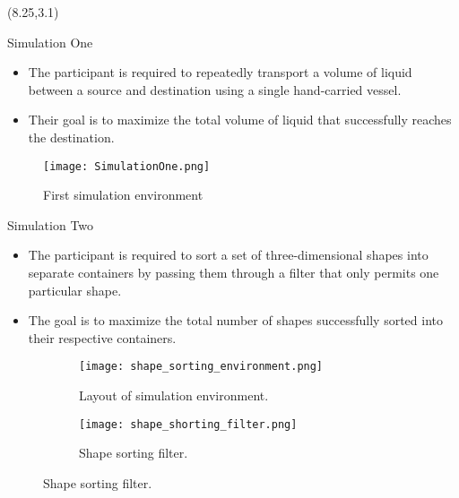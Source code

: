 \documentclass[22pt]{beamer}
\begin{document}
\begin{frame}[fragile]
\begin{textblock}{7.25}
\end{textblock}




\begin{textblock}{7.25}(8.25,3.1)

\begin{block}{Simulation One}\newline
\begin{itemize}
\item The participant is required to repeatedly transport a
volume of liquid between a source and destination using a single hand-carried
vessel.
\item Their goal is to maximize the total volume of liquid that successfully
reaches the destination.
\end{itemize}

\begin{figure}
  \centering
  \texttt{[image: SimulationOne.png]}
  \caption{First simulation environment}
\label{fig:simOne}
\end{figure}

\end{block}



\begin{block}{Simulation Two}\newline
\begin{itemize}
\item The participant is required to sort a set of three-dimensional shapes into separate containers by passing them through a filter that only permits one particular shape.
\item The goal is to maximize the total number of shapes successfully sorted into their respective containers.
\end{itemize}
\begin{figure}
  \begin{subfigure}[b]{0.40\textwidth}
    \texttt{[image: shape\_sorting\_environment.png]}
        \caption{Layout of simulation environment.}
  \end{subfigure}
  \begin{subfigure}[b]{0.40\textwidth}
    \texttt{[image: shape\_shorting\_filter.png]}
        \caption{Shape sorting filter.}
    \end{subfigure}
 \end{figure}
\end{block}



\end{textblock}
\end{frame}
\end{document}
